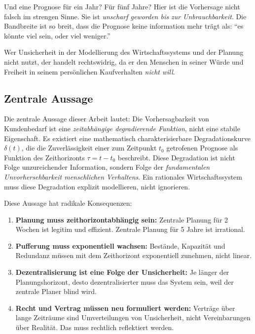 \documentclass[a4paper, 12pt, twoside, openright]{report}
\theoremstyle{definition}
\theoremstyle{definition}
\begin{document}
Und eine Prognose für ein Jahr? Für fünf Jahre? Hier ist die Vorhersage nicht falsch im strengen Sinne. Sie ist \emph{unscharf geworden bis zur Unbrauchbarkeit}. Die Bandbreite ist so breit, dass die Prognose keine information mehr trägt als: ``es könnte viel sein, oder viel weniger.''

Wer Unsicherheit in der Modellierung des Wirtschaftssystems und der Planung nicht nutzt, der handelt rechtswidrig, da er den Menschen in seiner Würde und Freiheit in seinem persönlichen Kaufverhalten \textit{nicht will}.

\subsection{Zentrale Aussage}

Die zentrale Aussage dieser Arbeit lautet: Die Vorhersagbarkeit von Kundenbedarf ist eine \emph{zeitabhängige degradierende Funktion}, nicht eine stabile Eigenschaft. Es existiert eine mathematisch charakterisierbare Degradationskurve $\delta(t)$, die die Zuverlässigkeit einer zum Zeitpunkt $t_0$ getrofenen Prognose als Funktion des Zeithorizonts $\tau = t - t_0$ beschreibt. Diese Degradation ist nicht Folge unzureichender Information, sondern Folge der \emph{fundamentalen Unvorhersehbarkeit menschlichen Verhaltens}. Ein rationales Wirtschaftssystem muss diese Degradation explizit modellieren, nicht ignorieren.

Diese Aussage hat radikale Konsequenzen:

\begin{enumerate}[label=(\roman*)]
  \item \textbf{Planung muss zeithorizontabhängig sein:} Zentrale Planung für 2 Wochen ist legitim und effizient. Zentrale Planung für 5 Jahre ist irrational.
  
  \item \textbf{Pufferung muss exponentiell wachsen:} Bestände, Kapazität und Redundanz müssen mit dem Zeithorizont exponentiell zunehmen, nicht linear.
  
  \item \textbf{Dezentralisierung ist eine Folge der Unsicherheit:} Je länger der Planungshorizont, desto dezentralisierter muss das System sein, weil der zentrale Planer blind wird.
  
  \item \textbf{Recht und Vertrag müssen neu formuliert werden:} Verträge über lange Zeiträume sind Umverteilungen von Unsicherheit, nicht Vereinbarungen über Realität. Das muss rechtlich reflektiert werden.
\end{enumerate}
\end{document}
